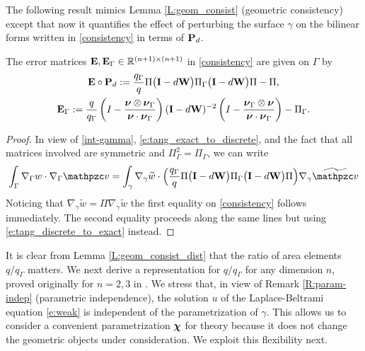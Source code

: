 The following result mimics Lemma \ref{L:geom_consist} (geometric consistency)
except that now it quantifies the effect of perturbing the surface $\gamma$ on the
bilinear forms written in \eqref{consistency} in terms of ${\bf P}_d$.

\begin{lemma}\label{L:geom_consist_dist}
The error matrices
${\bf E},{\bf E}_\Gamma \in\mathbb{R}^{(n+1)\times(n+1)}$ in \eqref{consistency}
are given on $\Gamma$ by
%
\begin{gather}\label{error-matrix-gamma}
  {\bf E}\circ{\bf P}_d := \frac{q_\Gamma}{q} \Pi \big({\bf I}
  - d{\bf W} \big) \Pi_\Gamma
  \big({\bf I} - d {\bf W} \big) \Pi  - \Pi,
  \\
  \label{error-matrix-Gamma}
  {\bf E}_\Gamma :=  { q \over q_\Gamma } \left( I - \frac{{\boldsymbol \nu} \otimes {\boldsymbol \nu}_\Gamma}{ {\boldsymbol \nu} \cdot {\boldsymbol \nu}_\Gamma}\right) ({\bf I} -d {\bf W})^{-2}  \left( I - \frac{{\boldsymbol \nu}_\Gamma \otimes {\boldsymbol \nu}}{ {\boldsymbol \nu} \cdot {\boldsymbol \nu}_\Gamma}\right)- \Pi_\Gamma.
\end{gather}  
%
\end{lemma}
%
\begin{proof}
In view of \eqref{int-gamma}, \eqref{e:tang_exact_to_discrete}, and the fact
that all matrices involved are symmetric and $\Pi_\Gamma^2=\Pi_\Gamma$, we can write
%  
\[
\int_\Gamma \nabla_\Gamma w \cdot \nabla_\Gamma\tv
= \int_\gamma \nabla_\gamma \widetilde{w} \cdot
\Big(\frac{q_\Gamma}{q} \Pi \big(\bI - d\bW \big)
\Pi_\Gamma\big(\bI - d \bW \big) \Pi\Big)
\nabla_\gamma\widetilde\tv
\]
%
Noticing that $\nabla_\gamma \widetilde{w} = \Pi \nabla_\gamma \widetilde{w}$
the first equality on \eqref{consistency} follows immediately. The second
equality proceeds along the same lines but using \eqref{e:tang_discrete_to_exact}
instead.
\end{proof}  

It is clear from Lemma \ref{L:geom_consist_dist} that the ratio of area
elements $q / q_\Gamma$ matters.
We next derive a representation for $q / q_\Gamma$ for any dimension $n$,
proved originally for $n=2,3$ in \cite{DemlowDziuk:07,De09}.
We stress that, in view of Remark \ref{R:param-indep} (parametric independence),
the solution $u$ of the Laplace-Beltrami equation \eqref{e:weak} is independent
of the parametrization of $\gamma$. This allows us to consider a convenient
parametrization ${\boldsymbol \chi}$ for theory because it does not change the geometric
objects under consideration. We exploit this flexibility next.

